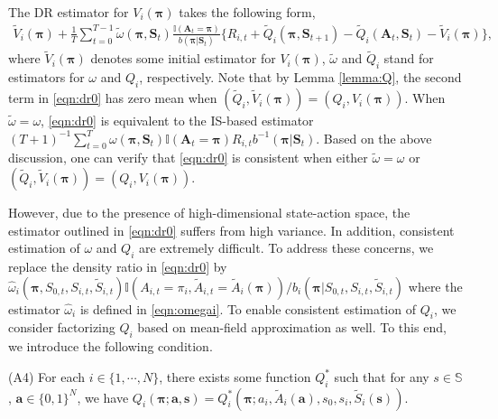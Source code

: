 \documentclass{article}
\begin{document}
The DR estimator for $V_i(\bm{\pi})$ takes the following form, \vspace{-0.1cm}
\begin{eqnarray}\label{eqn:dr0}
	\widetilde{V}_i(\bm{\pi})+\frac{1}{T}\sum_{t=0}^{T-1} \widetilde{\omega}(\bm{\pi},\bm{S}_t) \frac{\mathbb{I}(\bm{A}_t=\bm{\pi})}{b(\bm{\pi}|\bm{S}_t)}\{R_{i,t}+\widetilde{Q}_i(\bm{\pi},\bm{S}_{t+1})-\widetilde{Q}_i(\bm{A}_t,\bm{S}_t)-\widetilde{V}_i(\bm{\pi})\},
\end{eqnarray}
where $\widetilde{V}_i(\bm{\pi})$ denotes some initial estimator for $V_i(\bm{\pi})$, $\widetilde{\omega}$ and $\widetilde{Q}_i$ stand for estimators for $\omega$ and $Q_i$, respectively. Note that by Lemma \ref{lemma:Q}, the second term in \eqref{eqn:dr0} has zero mean when $(\widetilde{Q}_i,\widetilde{V}_i(\bm{\pi}))=(Q_i,V_i(\bm{\pi}))$. When $\widetilde{\omega}=\omega$, \eqref{eqn:dr0} is equivalent to the IS-based estimator $(T+1)^{-1}\sum_{t=0}^T \omega(\bm{\pi},\bm{S}_t) \mathbb{I}(\bm{A}_t=\bm{\pi})R_{i,t}b^{-1}(\bm{\pi}|\bm{S}_t)$. Based on the above discussion, one can verify that \eqref{eqn:dr0} is consistent when either $\widetilde{\omega}=\omega$ or $(\widetilde{Q}_i,\widetilde{V}_i(\bm{\pi}))=(Q_i,V_i(\bm{\pi}))$. %

However, due to the presence of high-dimensional state-action space, the estimator outlined in \eqref{eqn:dr0} suffers from high variance. In addition, consistent estimation of $\omega$ and $Q_i$ are extremely difficult. To address these concerns, we replace the density ratio in \eqref{eqn:dr0} by $\widehat{\omega}_i(\bm{\pi},S_{0,t},S_{i,t},\widetilde{S}_{i,t})\mathbb{I}(A_{i,t}=\pi_i,\widetilde{A}_{i,t}=\widetilde{A}_i(\bm{\pi}))/b_i(\bm{\pi}|S_{0,t},S_{i,t},\widetilde{S}_{i,t})$ where the estimator $\widehat{\omega}_i$ is defined in \eqref{eqn:omegai}. To enable consistent estimation of $Q_i$, we consider factorizing $Q_i$ based on mean-field approximation as well. To this end, we introduce the following condition. 

(A4) For each $i\in \{1,\cdots,N\}$, there exists some function $Q_i^*$ such that for any $s\in \mathbb{S}$, $\bm{a}\in \{0,1\}^N$, we have $Q_i(\bm{\pi};\bm{a},\bm{s})=Q_i^*(\bm{\pi};a_i,\widetilde{A}_i(\bm{a}),s_0,s_i,\widetilde{S}_i(\bm{s}))$.
\end{document}
